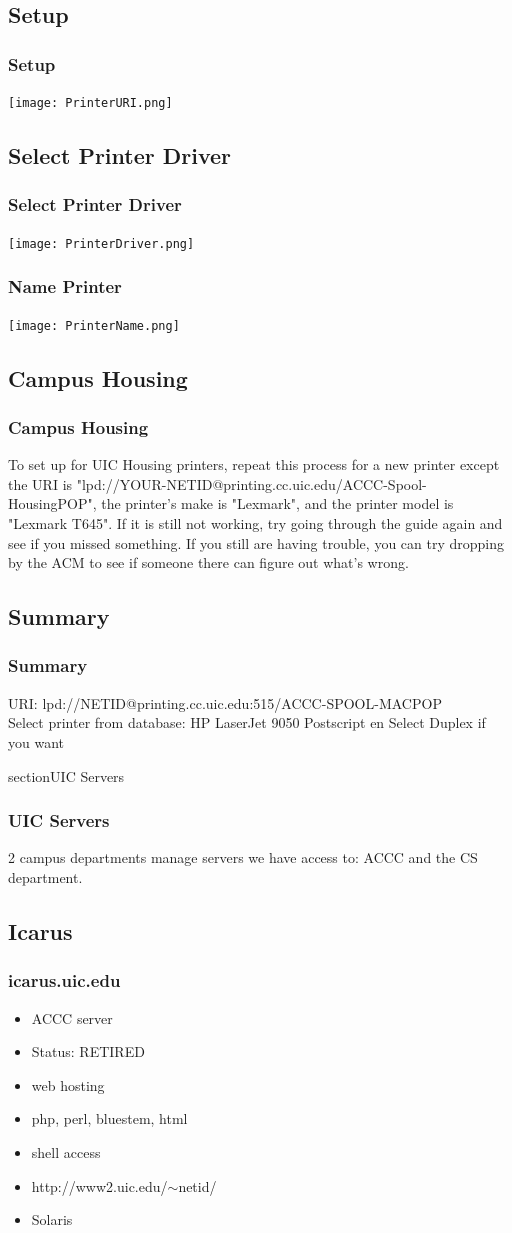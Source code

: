 \documentclass[hyperref={pdfpagelabels=false}]{beamer}
\begin{document}
\subsection{Setup}
\frame
{
    \frametitle{Setup}
     \texttt{[image: PrinterURI.png]}
}
\subsection{Select Printer Driver}
\frame
{
    \frametitle{Select Printer Driver}
     \texttt{[image: PrinterDriver.png]}
}
\frame
{
    \frametitle{Name Printer}
     \texttt{[image: PrinterName.png]}

}
\subsection{Campus Housing}
\frame
{
	\frametitle{Campus Housing}
	To set up for UIC Housing printers, repeat this process for a new printer except the URI is "lpd://YOUR-NETID@printing.cc.uic.edu/ACCC-Spool-HousingPOP", the printer's make is "Lexmark", and the printer model is "Lexmark T645". If it is still not working, try going through the guide again and see if you missed something. If you still are having trouble, you can try dropping by the ACM to see if someone there can figure out what's wrong. 
}
\subsection{Summary}
\frame
{
    \frametitle{Summary}
URI: lpd://NETID@printing.cc.uic.edu:515/ACCC-SPOOL-MACPOP\\
Select printer from database: HP LaserJet 9050 Postscript en
Select Duplex if you want


}
section{UIC Servers}
\frame
{
    \frametitle{UIC Servers}
    2 campus departments manage servers we have access to: ACCC and the CS department.
}
\subsection{Icarus}
\frame
{
    \frametitle{icarus.uic.edu}
    \begin{itemize}
    \item{ACCC server}
    \item{Status: RETIRED}
    \item{web hosting}
    \item{php, perl, bluestem, html}
    \item{shell access}
    \item{http://www2.uic.edu/$\sim$netid/}
    \item{Solaris}
    \end{itemize}
}
\end{document}
